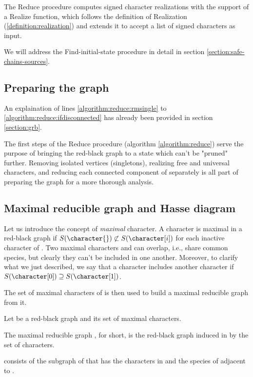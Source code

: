 The Reduce procedure computes signed character realizations with the support of a Realize function, which follows the definition of Realization (\ref{definition:realization}) and extends it to accept a list of signed characters as input.

We will address the Find-initial-state procedure in detail in section \ref{section:safe-chains-sources}.

\subsection{Preparing the graph}\label{section:preparing-the-graph}

An explaination of lines \ref{algorithm:reduce:rmsingle} to \ref{algorithm:reduce:ifdisconnected} has already been provided in section \ref{section:grb}.

The first steps of the Reduce procedure (algorithm \ref{algorithm:reduce}) serve the purpose of bringing the red-black graph to a state which can't be "pruned" further.
Removing isolated vertices (singletons), realizing free and universal characters, and reducing each connected component of \grb{} separately is all part of preparing the graph for a more thorough analysis.

\subsection{Maximal reducible graph and Hasse diagram}\label{section:gm-hassediagram}

Let us introduce the concept of \emph{maximal} character.
A character \character{} is maximal in a red-black graph \grb{} if $S(\character{}) \not\subset S(\character[i])$ for each inactive character \character[i] of \grb{}.
Two maximal characters \character[0] and \character[1] can overlap, i.e., share common species, but clearly they can't be included in one another.
Moreover, to clarify what we just described, we say that a character \character[0] includes another character \character[1] if $S(\character[0]) \supseteq S(\character[1])$.

The set of maximal characters of \grb{} is then used to build a maximal reducible graph \grbcm{} from it.

\begin{definition}\label{definition:maximal-reducible-graph}
  Let \grb{} be a red-black graph and \cm{} its set of maximal characters.

  The maximal reducible graph \grbcm{}, \gm{} for short, is the red-black graph induced in \grb{} by the set \cm{} of characters.

  \gm{} consists of the subgraph of \grb{} that has the characters in \cm{} and the species of \grb{} adjacent to \cm{}.
\end{definition}

